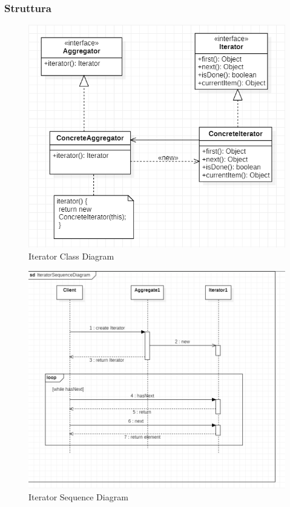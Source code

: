 \documentclass{article}
\begin{document}
\subsubsection{Struttura}

\begin{figure} [H]
\begin{center}
\includegraphics[scale=0.5]{IteratorClassDiagram.png}
\end{center}
\caption{Iterator Class Diagram}
\end{figure}

\begin{figure} [H]
\begin{center}
\includegraphics[scale=0.5]{IteratorSequenceDiagram.png}
\end{center}
\caption{Iterator Sequence Diagram}
\end{figure}
\end{document}
